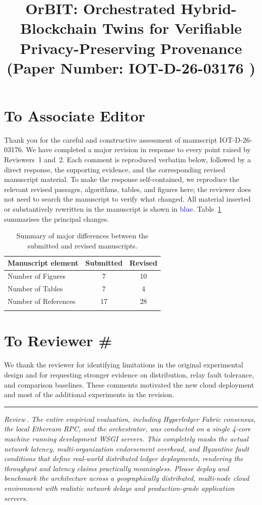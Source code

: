 \documentclass[11pt]{article}
\title{OrBIT: Orchestrated Hybrid-Blockchain Twins for Verifiable Privacy-Preserving Provenance \\ (Paper Number: IOT-D-26-03176 )}
\author{}
\newcounter{reviewer}
\newcounter{point}[reviewer]
\renewcommand{\thepoint}{Review\,\thereviewer.\arabic{point}}
\newcommand{\point}[1]{\refstepcounter{point}  \bigskip \hrule \medskip \noindent \textit{{\fontseries{b}\selectfont \thepoint } #1}\par}
\newcommand{\reviewersection}{\stepcounter{reviewer}
                  \section*{To Reviewer \#\thereviewer}}
\newcommand{\editorsection}{\section*{To Associate Editor}}
\newcommand\T{\rule{0pt}{2.5ex}}       %
\newcommand\B{\rule[-1.3ex]{0pt}{0pt}} %
\begin{document}
\maketitle

\vspace{10 pt}

\newpage
\editorsection
\justifying
Thank you for the careful and constructive assessment of manuscript IOT-D-26-03176. We have completed a major revision in response to every point raised by Reviewers~1 and~2. Each comment is reproduced verbatim below, followed by a direct response, the supporting evidence, and the corresponding revised manuscript material. To make the response self-contained, we reproduce the relevant revised passages, algorithms, tables, and figures here; the reviewer does not need to search the manuscript to verify what changed. All material inserted or substantively rewritten in the manuscript is shown in \textcolor{blue}{blue}. Table~\ref{edited} summarises the principal changes.

 \begin{table}[!thbp]
    \caption{Summary of major differences between the submitted and revised manuscripts.}
    \label{edited}
    \centering
    \begin{tabular}{l|c|c}
    \hline\hline
    Manuscript element & Submitted & Revised\T\B\\ \hline\hline
        Number of Figures                      & 7 &  10 \T\B\\\hline
        Number of Tables                            & 7 & 4     \T\B\\\hline

        Number of References                               & 17 &   28 \T\B\\ \hline\hline
    \multicolumn{2}{l}{\parbox{3.3in}{}}
    \end{tabular}
    \vspace{-4mm}
    \end{table}
\newpage
\reviewersection

We thank the reviewer for identifying limitations in the original experimental
design and for requesting stronger evidence on distribution, relay fault
tolerance, and comparison baselines. These comments motivated the new cloud
deployment and most of the additional experiments in the revision.

\point{The entire empirical evaluation, including Hyperledger Fabric consensus,
the local Ethereum RPC, and the orchestrator, was conducted on a single 4-core
machine running development WSGI servers. This completely masks the actual
network latency, multi-organization endorsement overhead, and Byzantine fault
conditions that define real-world distributed ledger deployments, rendering the
throughput and latency claims practically meaningless. Please deploy and
benchmark the architecture across a geographically distributed, multi-node
cloud environment with realistic network delays and production-grade
application servers.}
\end{document}
